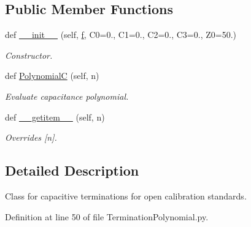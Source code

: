 \subsection*{Public Member Functions}
\begin{DoxyCompactItemize}
\item 
def \hyperlink{classSignalIntegrity_1_1Measurement_1_1CalKit_1_1Standards_1_1TerminationPolynomial_1_1TerminationCPolynomial_aec9ef08a9bd3bdd31ca01580d655143d}{\+\_\+\+\_\+init\+\_\+\+\_\+} (self, \hyperlink{classSignalIntegrity_1_1SParameters_1_1SParameters_1_1SParameters_a32e7a34d6837fe949b413c852a0447f8}{f}, C0=0., C1=0., C2=0., C3=0., Z0=50.)
\begin{DoxyCompactList}\small\item\em Constructor. \end{DoxyCompactList}\item 
def \hyperlink{classSignalIntegrity_1_1Measurement_1_1CalKit_1_1Standards_1_1TerminationPolynomial_1_1TerminationCPolynomial_a03914e112a09cbcbc1c25192a1048d0a}{PolynomialC} (self, n)
\begin{DoxyCompactList}\small\item\em Evaluate capacitance polynomial. \end{DoxyCompactList}\item 
def \hyperlink{classSignalIntegrity_1_1Measurement_1_1CalKit_1_1Standards_1_1TerminationPolynomial_1_1TerminationCPolynomial_ab7a6da5139e0878b590d68292aaa70f2}{\+\_\+\+\_\+getitem\+\_\+\+\_\+} (self, n)
\begin{DoxyCompactList}\small\item\em Overrides \mbox{[}n\mbox{]}. \end{DoxyCompactList}\end{DoxyCompactItemize}


\subsection{Detailed Description}
Class for capacitive terminations for open calibration standards. 

Definition at line 50 of file Termination\+Polynomial.\+py.



